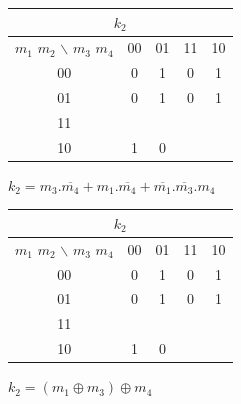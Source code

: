 \begin{minipage}{0.45\linewidth}
\begin{center}
\begin{tabular}{|c|c|c|c|c|}
\hline
\multicolumn{5}{|c|}{$k_2$} \\
\hline
$m_1$ $m_2$ $\backslash$ $m_3$ $m_4$ & 00 & 01 & 11 & 10 \\
\hline
00  & 0 & \cellcolor{bleuf} 1 & 0 & \cellcolor{bleuf} 1  \\
\hline
01  & 0 & \cellcolor{bleuf} 1 & 0 &  \cellcolor{bleuf} 1 \\
\hline
11  & \cellcolor{bleuf} &  &  & \cellcolor{bleuf} \\
\hline
10  & \cellcolor{bleuf} 1 & 0 &  & \cellcolor{bleuf} \\
\hline
\end{tabular} 
\end{center}
\end{minipage}\hfill
\begin{minipage}{0.45\linewidth}
$k_2=m_3.\overline{m_4}+m_1.\overline{m_4}+\overline{m_1}.\overline{m_3}.m_4$
\end{minipage}

\begin{minipage}{0.45\linewidth}
\begin{center}
\begin{tabular}{|c|c|c|c|c|}
\hline
\multicolumn{5}{|c|}{$k_2$} \\
\hline
$m_1$ $m_2$ $\backslash$ $m_3$ $m_4$ & 00 & 01 & 11 & 10 \\
\hline
00  & 0 & \cellcolor{bleuf} 1 & 0 & \cellcolor{bleuf} 1  \\
\hline
01  & 0 & \cellcolor{bleuf} 1 & 0 &  \cellcolor{bleuf} 1 \\
\hline
11  & \cellcolor{bleuf} &  & \cellcolor{bleuf} &  \\
\hline
10  & \cellcolor{bleuf} 1 & 0 & \cellcolor{bleuf} &  \\
\hline
\end{tabular} 
\end{center}
\end{minipage}\hfill
\begin{minipage}{0.45\linewidth}
$k_2=(m_1 \oplus m_3) \oplus m_4$
\end{minipage}

